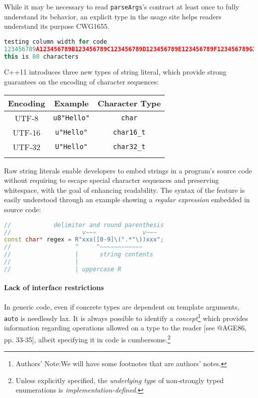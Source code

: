 \documentclass[twoside,10pt,letterpaper,usenames]{newstyle-PearsonGeneric-7-38}
\newcommand{\authorsnote}{Authors' Note:}
\let\Begin\begin
\let\End\end
\begin{document}
While it may be necessary to read \texttt{parseArgs}'s contract at least
once to fully understand its behavior, an explicit type in the usage
site helps readers understand its purpose CWG1655.

\begin{lstlisting}[language=C++]
testing column width for code
123456789A123456789B123456789C123456789D123456789E123456789F123456789G123456789H
this is 80 characters
\end{lstlisting}
    

C++11 introduces three new types of string literal, which provide strong
guarantees on the encoding of character sequences:

\Begin{center}
\Begin{tabular}{c|c|c}
\thickhline

\textbf{Encoding} & \textbf{Example} & \textbf{Character Type} \\ \hline
UTF-8 & \texttt{u8"Hello"} & \texttt{char} \\ \hline UTF-16 &
\texttt{u"Hello"} & \texttt{char16\_t} \\ \hline UTF-32 &
\texttt{U"Hello"} & \texttt{char32\_t} \\

\thickhline
\End{tabular}
\End{center}

Raw string literals enable developers to embed strings in a program's
source code without requiring to escape special character sequences and
preserving whitespace, with the goal of enhancing readability. The
syntax of the feature is easily understood through an example showing a
\emph{regular expression} embedded in source code:

\begin{lstlisting}[language=C++]
//            delimiter and round parenthesis
//                    v~~~             v~~~
const char* regex = R"xxx([0-9]\(".*"\))xxx";
//                  ^     ^~~~~~~~~~~~~
//                  |      string contents
//                  |
//                  | uppercase R
\end{lstlisting}
    

\paragraph[Lack of interface restrictions]{Lack of interface restrictions}\label{lack-of-interface-restrictions}

In generic code, even if concrete types are dependent on template
arguments, \texttt{auto} is needlessly lax. It is always possible to
identify a \emph{concept}{\cprotect\footnote{\authorsnote We will have
some footnotes that are authors' notes.}} which provides information
regarding operations allowed on a type to the reader {[}see @AGE86, pp.
33-35{]}, albeit specifying it in code is
cumbersome.{\cprotect\footnote{Unless explicitly specified, the
\emph{underlying type} of non-strongly typed enumerations is
\emph{implementation-defined}.}}
\end{document}
